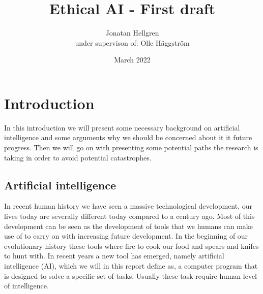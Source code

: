 \documentclass[12pt,A4]{report}
\title{Ethical AI - First draft}
\author{Jonatan Hellgren\\
under supervison of: Olle Häggström}
\date{March 2022}
\theoremstyle{definition}
\begin{document}
\maketitle


\thispagestyle{empty}

\newpage
{}

\tableofcontents

\newpage
{}


\chapter{Introduction}
In this introduction we will present some necessary background on artificial intelligence and some arguments why we should be concerned about it it future progress. Then we will go on with presenting some potential paths the research is taking in order to avoid potential catastrophes. 

\section{Artificial intelligence}

In recent human history we have seen a massive technological development, our lives today are severally different today compared to a century ago. Most of this development can be seen as the development of tools that we humans can make use of to carry on with increasing future development. In the beginning of our evolutionary history these tools where fire to cook our food and spears and knifes to hunt with. In recent years a new tool has emerged, namely artificial intelligence (AI), which we will in this report define as, a computer program that is designed to solve a specific set of tasks. Usually these task require human level of intelligence.
\end{document}
